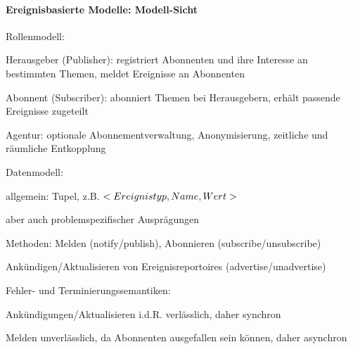 \documentclass[10pt]{article}
\begin{document}
\paragraph{Ereignisbasierte Modelle: Modell-Sicht}
\begin{itemize*}
  \item Rollenmodell:
  \begin{itemize*}
    \item Herausgeber (Publisher): registriert Abonnenten und ihre Interesse an bestimmten Themen, meldet Ereignisse an Abonnenten
    \item Abonnent (Subscriber): abonniert Themen bei Herausgebern, erhält passende Ereignisse zugeteilt
    \item Agentur: optionale Abonnementverwaltung, Anonymisierung, zeitliche und räumliche Entkopplung
  \end{itemize*}
  \item Datenmodell:
  \begin{itemize*}
    \item allgemein: Tupel, z.B. $<Ereignistyp,\space Name,\space Wert>$
    \item aber auch problemspezifischer Ausprägungen
    \item Methoden: Melden (notify/publish), Abonnieren (subscribe/unsubscribe)
    \item Ankündigen/Aktualisieren von Ereignisreportoires (advertise/unadvertise)
  \end{itemize*}
  \item Fehler- und Terminierungssemantiken:
  \begin{itemize*}
    \item Ankündigungen/Aktualisieren i.d.R. verlässlich, daher synchron
    \item Melden unverlässlich, da Abonnenten ausgefallen sein können, daher asynchron
  \end{itemize*}
\end{itemize*}
\end{document}
